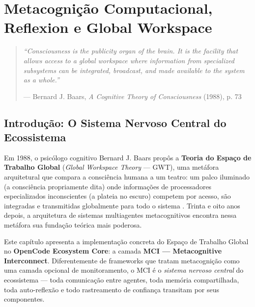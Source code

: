 
\chapter{Metacognição Computacional, Reflexion e Global Workspace}
\label{ch:metacognicao}

\begin{quote}
\textit{``Consciousness is the publicity organ of the brain. It is the facility that
allows access to a global workspace where information from specialized subsystems
can be integrated, broadcast, and made available to the system as a whole.''}
\begin{flushright}
--- Bernard J. Baars, \textit{A Cognitive Theory of Consciousness} (1988), p. 73
\end{flushright}
\end{quote}

\section{Introdução: O Sistema Nervoso Central do Ecossistema}
\label{sec:intro}

Em 1988, o psicólogo cognitivo Bernard J. Baars propôs a \textbf{Teoria do Espaço de Trabalho Global} (\textit{Global Workspace Theory} — GWT), uma metáfora arquitetural que compara a consciência humana a um teatro: um palco iluminado (a consciência propriamente dita) onde informações de processadores especializados inconscientes (a plateia no escuro) competem por acesso, são integradas e transmitidas globalmente para todo o sistema \cite{Baars1988_GWT, Baars1997_Theater}. Trinta e oito anos depois, a arquitetura de sistemas multiagentes metacognitivos encontra nessa metáfora sua fundação teórica mais poderosa.

Este capítulo apresenta a implementação concreta do Espaço de Trabalho Global no \textbf{OpenCode Ecosystem Core}: a camada \textbf{MCI — Metacognitive Interconnect}. Diferentemente de frameworks que tratam metacognição como uma camada opcional de monitoramento, o MCI é o \textit{sistema nervoso central} do ecossistema — toda comunicação entre agentes, toda memória compartilhada, toda auto-reflexão e todo rastreamento de confiança transitam por seus componentes.

